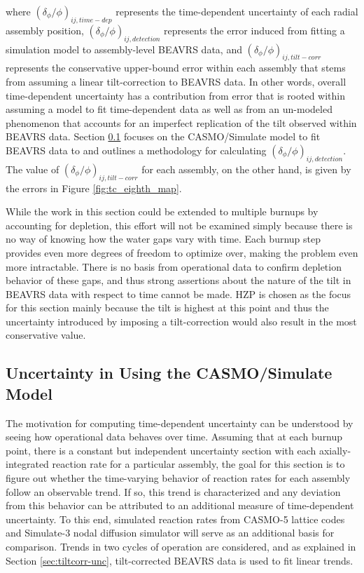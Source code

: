 \documentclass{article}
\begin{document}
where $\left(\delta_\phi/\phi \right)_{ij,time-dep}$ represents the time-dependent uncertainty of each radial assembly position, $\left(\delta_\phi/\phi \right)_{ij,detection}$ represents the error induced from  fitting a simulation model to assembly-level BEAVRS data, and $\left(\delta_\phi/\phi \right)_{ij,tilt-corr}$ represents the conservative upper-bound error within each assembly that stems from assuming a linear tilt-correction to BEAVRS data. In other words, overall time-dependent uncertainty has a contribution from error that is rooted within assuming a model to fit time-dependent data as well as from an un-modeled phenomenon that accounts for an imperfect replication of the tilt observed within BEAVRS data. Section \ref{sec:cassim-unc} focuses on the CASMO/Simulate model to fit BEAVRS data to and outlines a methodology for calculating $\left(\delta_\phi/\phi\right)_{ij,detection}$. The value of $\left(\delta_\phi/\phi \right)_{ij,tilt-corr}$ for each assembly, on the other hand, is given by the errors in Figure \ref{fig:tc_eighth_map}.

While the work in this section could be extended to multiple burnups by accounting for depletion, this effort will not be examined simply because there is no way of knowing how the water gaps vary with time. Each burnup step provides even more degrees of freedom to optimize over, making the problem even more intractable. There is no basis from operational data to confirm depletion behavior of these gaps, and thus strong assertions about the nature of the tilt in BEAVRS data with respect to time cannot be made. HZP is chosen as the focus for this section mainly because the tilt is highest at this point and thus the uncertainty introduced by imposing a tilt-correction would also result in the most conservative value.



\subsection{Uncertainty in Using the CASMO/Simulate Model}\label{sec:cassim-unc}

The motivation for computing time-dependent uncertainty can be understood by seeing how operational data behaves over time. Assuming that at each burnup point, there is a constant but independent uncertainty section with each axially-integrated reaction rate for a particular assembly, the goal for this section is to figure out whether the time-varying behavior of reaction rates for each assembly follow an observable trend. If so, this trend is characterized and any deviation from this behavior can be attributed to an additional measure of time-dependent uncertainty. To this end, simulated reaction rates from CASMO-5 \cite{rhodes2006casmo} lattice codes and Simulate-3 \cite{cronin1995simulate} nodal diffusion simulator will serve as an additional basis for comparison. Trends in two cycles of operation are considered, and as explained in Section \ref{sec:tiltcorr-unc}, tilt-corrected BEAVRS data is used to fit linear trends.
\end{document}
